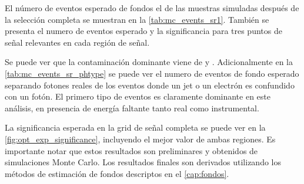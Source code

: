 El número de eventos esperado de fondos el {\SM} de las muestras simuladas
después de la selección completa se muestran en la \cref{tab:mc_events_sr1}.
También se presenta el numero de eventos esperado y la significancia para tres puntos
de señal relevantes en cada región de señal.

Se puede ver que la contaminación dominante viene de {\wgam} y {\ttgam}. Adicionalmente
en la \cref{tab:mc_events_sr_phtype} se puede ver el numero de eventos de fondo
esperado separando fotones reales de los eventos donde un jet o un electrón es confundido
con un fotón. El primero tipo de eventos es claramente dominante en este análisis, en
presencia de energía faltante tanto real como instrumental.

La significancia esperada en la grid de señal completa se puede ver en la \cref{fig:opt_exp_significance},
incluyendo el mejor valor de ambas regiones. Es importante notar que estos
resultados son preliminares y obtenidos de simulaciones Monte Carlo. Los resultados
finales son derivados utilizando los métodos de estimación de fondos descriptos en
el \cref{cap:fondos}. %

